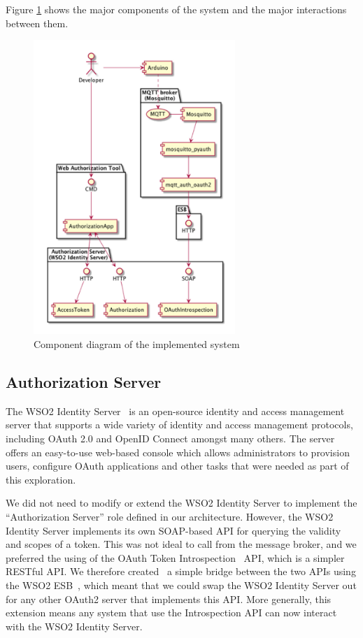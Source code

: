 \documentclass{IEEEtran}
\begin{document}
Figure \ref{fig:component-diagram} shows 
the major components of the system and the major interactions between them. 
\begin{figure}[!t]
\centering
\includegraphics[width=3in]{component-diagram.png}
\caption{Component diagram of the implemented system}
\label{fig:component-diagram}
\end{figure}

\subsection{Authorization Server}
The WSO2 Identity Server~\cite{wso2-identity-server} is an open-source identity and access management
server that supports a wide variety of identity and access management protocols, including 
OAuth 2.0 and OpenID Connect amongst many others. The server offers an easy-to-use web-based console
which allows administrators to provision users, configure OAuth applications and other tasks 
that were needed as part of this exploration. 

We did not need to modify or extend the WSO2 Identity 
Server to implement the ``Authorization Server'' role defined in our architecture. However, the WSO2 Identity Server implements its own SOAP-based API for querying the validity and scopes of a token. This was not ideal to call from the message broker, and we preferred the using of the OAuth Token Introspection~\cite{richer2013oauth} API, which is a simpler RESTful API. We therefore created~\cite{oauth-introspection-blog} a simple bridge between the two APIs using the WSO2 ESB~\cite{wso2-esb}, which meant that we could swap the WSO2 Identity Server out for any other OAuth2 server that implements this API. More generally, this extension means any system that use the Introspection API can now interact with the WSO2 Identity Server.
\end{document}
